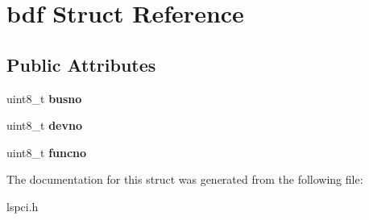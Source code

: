 \section{bdf Struct Reference}
\label{structbdf}
\subsection*{Public Attributes}
\begin{DoxyCompactItemize}
\item 
\mbox{\label{structbdf_a762c84123179ffb0b3ad429b62ec3a7f}} 
uint8\+\_\+t {\bfseries busno}
\item 
\mbox{\label{structbdf_a0006c4f9af15bfdf335946b00b5fc607}} 
uint8\+\_\+t {\bfseries devno}
\item 
\mbox{\label{structbdf_a8d29b242e2219cf5f0b6d68f4f724a25}} 
uint8\+\_\+t {\bfseries funcno}
\end{DoxyCompactItemize}


The documentation for this struct was generated from the following file\+:\begin{DoxyCompactItemize}
\item 
lspci.\+h\end{DoxyCompactItemize}
